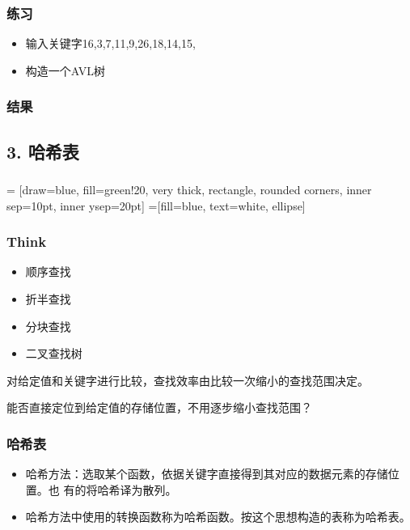 \begin{frame}[fragile]
  \frametitle{练习}
  \begin{itemize}
  \item 输入关键字16,3,7,11,9,26,18,14,15,
  \item 构造一个AVL树
  \end{itemize}
\end{frame}

\begin{frame}[fragile]
  \frametitle{结果}

\end{frame}


\subsection{3. 哈希表}

\begin{frame}[plain]
  \frametitle{}
  \centering
   = [draw=blue, fill=green!20, very thick,
  rectangle, rounded corners, inner sep=10pt, inner ysep=20pt]
   =[fill=blue, text=white, ellipse]
  
  \vspace{1.0cm}
\end{frame}

\begin{frame}[fragile]
  \frametitle{Think}
  \begin{itemize}
  \item 顺序查找
  \item 折半查找
  \item 分块查找
  \item 二叉查找树
  \end{itemize}
  
  对给定值和关键字进行比较，查找效率由比较一次缩小的查找范围决定。

  能否直接定位到给定值的存储位置，不用逐步缩小查找范围？
\end{frame}

\begin{frame}[fragile]
  \frametitle{哈希表}
  \begin{itemize}
  \item 哈希方法：选取某个函数，依据关键字直接得到其对应的数据元素的存储位置。也
    有的将哈希译为散列。
  \item 哈希方法中使用的转换函数称为哈希函数。按这个思想构造的表称为哈希表。
  \end{itemize}
\end{frame}

